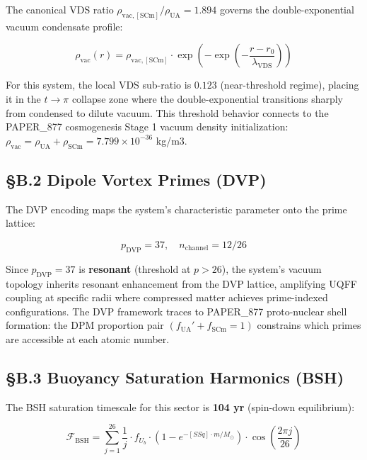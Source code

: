 \documentclass[12pt,a4paper]{article}
\begin{document}
The canonical VDS ratio $\rho_{\mathrm{vac,[SCm]}} / \rho_{\mathrm{UA}} = 1.894$ governs the double-exponential vacuum condensate profile:

\begin{equation}
\rho_{\mathrm{vac}}(r) = \rho_{\mathrm{vac,[SCm]}} \cdot \exp\!\left(-\exp\!\left(-\frac{r - r_0}{\lambda_{\mathrm{VDS}}}\right)\right)
\end{equation}

For this system, the local VDS sub-ratio is $0.123$ (near-threshold regime), placing it in the $t \to \pi$ collapse zone where the double-exponential transitions sharply from condensed to dilute vacuum. This threshold behavior connects to the PAPER\_877 cosmogenesis Stage 1 vacuum density initialization: $\rho_{\mathrm{vac}} = \rho_{\mathrm{UA}} + \rho_{\mathrm{SCm}} = 7.799 \times 10^{-36}$ kg/m3.

\subsection{\S{}B.2 Dipole Vortex Primes (DVP)}

The DVP encoding maps the system's characteristic parameter onto the prime lattice:

\begin{equation}
p_{\mathrm{DVP}} = 37, \quad n_{\mathrm{channel}} = 12/26
\end{equation}

Since $p_{\mathrm{DVP}} = 37$ is \textbf{resonant} (threshold at $p > 26$), the system's vacuum topology inherits resonant enhancement from the DVP lattice, amplifying UQFF coupling at specific radii where compressed matter achieves prime-indexed configurations. The DVP framework traces to PAPER\_877 proto-nuclear shell formation: the DPM proportion pair $(f_{\mathrm{UA}}' + f_{\mathrm{SCm}} = 1)$ constrains which primes are accessible at each atomic number.

\subsection{\S{}B.3 Buoyancy Saturation Harmonics (BSH)}

The BSH saturation timescale for this sector is \textbf{104 yr} (spin-down equilibrium):

\begin{equation}
\mathcal{F}_{\mathrm{BSH}} = \sum_{j=1}^{26} \frac{1}{j} \cdot f_U_b \cdot \left(1 - e^{-[SSq] \cdot m/M_\odot}\right) \cdot \cos\!\left(\frac{2\pi j}{26}\right)
\end{equation}
\end{document}
